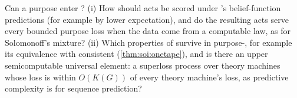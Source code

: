 \begin{question}\label{q:laws:purpose}
Can a purpose enter \SAIabbr? (i) How should acts be scored under \SAIabbr's belief-function predictions (for example by lower expectation), and do the resulting acts serve every bounded purpose loss when the data come from a computable law, as for Solomonoff's mixture? (ii) Which properties of \SAIabbr survive in purpose-\SAIabbr, for example its equivalence with consistent \SOIabbr (\cref{thm:soi:onetape}), and is there an upper semicomputable universal element: a superloss process over theory machines whose loss is within $O(K(G))$ of every theory machine's loss, as predictive complexity is for sequence prediction?
\end{question}
